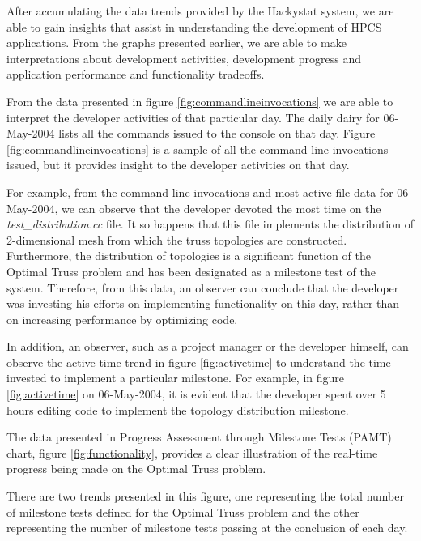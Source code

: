 \label{sec:conclusions}

After accumulating the data trends provided by the Hackystat system,
we are able to gain insights that assist in understanding the
development of HPCS applications.  From the graphs presented earlier,
we are able to make interpretations about development activities,
development progress and application performance and functionality
tradeoffs.

\label{sec:devactivities}

From the data presented in figure \ref{fig:commandlineinvocations} we
are able to interpret the developer activities of that particular day.
The daily dairy for 06-May-2004 lists all the commands issued to the
console on that day.  Figure \ref{fig:commandlineinvocations} is a
sample of all the command line invocations issued, but it provides
insight to the developer activities on that day.

For example, from the command line invocations and most active file
data for 06-May-2004, we can observe that the developer devoted the
most time on the {\it test_distribution.cc} file.  It so happens that this
file implements the distribution of 2-dimensional mesh from which the
truss topologies are constructed.  Furthermore, the distribution of
topologies is a significant function of the Optimal Truss problem and
has been designated as a milestone test of the system.  Therefore,
from this data, an observer can conclude that the developer was
investing his efforts on implementing functionality on this day,
rather than on increasing performance by optimizing code.

In addition, an observer, such as a project manager or the developer
himself, can observe the active time trend in figure
\ref{fig:activetime} to understand the time invested to implement a
particular milestone.  For example, in figure \ref{fig:activetime} on
06-May-2004, it is evident that the developer spent over 5 hours
editing code to implement the topology distribution milestone.

\label{sec:devprogress}

The data presented in Progress Assessment through Milestone Tests (PAMT)
chart, figure \ref{fig:functionality}, provides a clear illustration
of the real-time progress being made on the Optimal Truss problem.

There are two trends presented in this figure, one representing the
total number of milestone tests defined for the Optimal Truss problem
and the other representing the number of milestone tests passing at
the conclusion of each day.  


